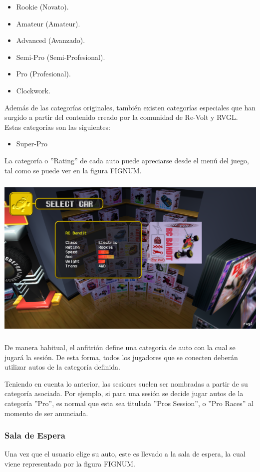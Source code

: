 \begin{itemize}
	\item Rookie (Novato).
	\item Amateur (Amateur).
	\item Advanced (Avanzado).
	\item Semi-Pro (Semi-Profesional).
	\item Pro (Profesional).
  \item Clockwork.
\end{itemize}

Además de las categorías originales, también existen categorías especiales que han surgido a partir del contenido creado por la comunidad de Re-Volt y RVGL. Estas categorías son las siguientes:

\begin{itemize}
	\item Super-Pro
\end{itemize}

La categoría o ''Rating'' de cada auto puede apreciarse desde el menú del juego, tal como se puede ver en la figura FIGNUM.

\includegraphics[width=15cm, height=8cm]{img/bandit.png}

De manera habitual, el anfitrión define una categoría de auto con la cual se jugará la sesión. De esta forma, todos los jugadores que se conecten deberán utilizar autos de la categoría definida.

Teniendo en cuenta lo anterior, las sesiones suelen ser nombradas a partir de su categoría asociada. Por ejemplo, si para una sesión se decide jugar autos de la categoría ''Pro'', es normal que esta sea titulada  ''Pros Session'', o ''Pro Races'' al momento de ser anunciada.

\subsubsection{Sala de Espera}
Una vez que el usuario elige su auto, este es llevado a la sala de espera, la cual viene representada por la figura FIGNUM.

